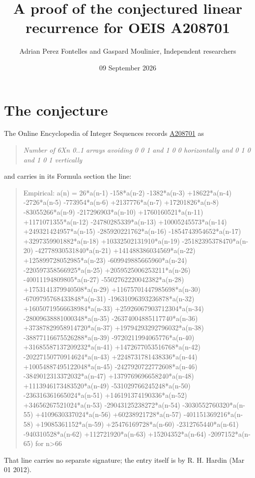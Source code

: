 \documentclass[11pt]{article}
\title{A proof of the conjectured linear recurrence for OEIS A208701}
\author{Adrian Perez Fontelles and Gaspard Moulinier, Independent researchers}
\date{09 September 2026}
\theoremstyle{definition}
\begin{document}
\maketitle
\section{The conjecture}

The Online Encyclopedia of Integer Sequences records \href{https://oeis.org/A208701}{A208701} as

\begin{quote}\itshape Number of 6Xn 0..1 arrays avoiding 0 0 1 and 1 0 0 horizontally and 0 1 0 and 1 0 1 vertically\end{quote}

and carries in its Formula section the line:

\begin{quote}\ttfamily Empirical: a(n) = 26*a(n-1) -158*a(n-2) -1382*a(n-3) +18622*a(n-4) -2726*a(n-5) -773954*a(n-6) +2137776*a(n-7) +17201826*a(n-8) -83055266*a(n-9) -217296903*a(n-10) +1760160521*a(n-11) +1171071355*a(n-12) -24780285339*a(n-13) +10005245573*a(n-14) +249321424957*a(n-15) -285920221762*a(n-16) -1854743954652*a(n-17) +3297359901882*a(n-18) +10332502131910*a(n-19) -25182395378470*a(n-20) -42778930531840*a(n-21) +141488386034569*a(n-22) +125899728052985*a(n-23) -609949885665960*a(n-24) -220597358566925*a(n-25) +2059525006253211*a(n-26) -40011194809805*a(n-27) -5502762220042382*a(n-28) +1753141379940508*a(n-29) +11675701447985698*a(n-30) -6709795768433848*a(n-31) -19631096393236878*a(n-32) +16050719566638984*a(n-33) +25926067903712304*a(n-34) -28009638881000348*a(n-35) -26374004885117740*a(n-36) +37387829958914720*a(n-37) +19794293292796032*a(n-38) -38877116675526288*a(n-39) -9720211994065776*a(n-40) +31685587137209232*a(n-41) +1472677053516768*a(n-42) -20227150770914624*a(n-43) +2248731781438336*a(n-44) +10054887495122048*a(n-45) -2427920722772608*a(n-46) -3849012313372032*a(n-47) +1379769696658240*a(n-48) +1113946173483520*a(n-49) -531029766245248*a(n-50) -236316361665024*a(n-51) +146191374190336*a(n-52) +34656267521024*a(n-53) -29043125238272*a(n-54) -3030552760320*a(n-55) +4109630337024*a(n-56) +60238921728*a(n-57) -401151369216*a(n-58) +19085361152*a(n-59) +25476169728*a(n-60) -2312765440*a(n-61) -940310528*a(n-62) +112721920*a(n-63) +15204352*a(n-64) -2097152*a(n-65) for n>66\end{quote}

That line carries no separate signature; the entry itself is by R. H. Hardin (Mar 01 2012).
\end{document}
